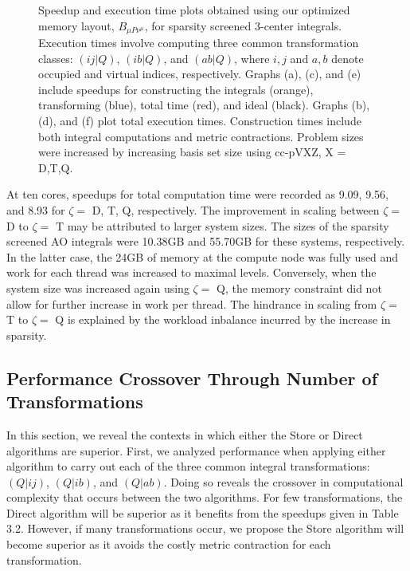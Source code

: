 \begin{figure}[H]
  \hfill
  \hfill
  \caption{Speedup and execution time plots obtained using our optimized memory layout, $B_{\mu P \nu^\mu}$, 
 for sparsity screened 3-center integrals. 
 Execution times involve computing three common transformation classes: $(ij|Q)$, $(ib|Q)$, and $(ab|Q)$,
 where $i,j$ and $a,b$ denote occupied and virtual indices, respectively. Graphs (a), (c), and (e) include speedups for constructing the integrals (orange),
 transforming (blue), total time (red), and ideal (black). Graphs (b), (d), and (f) plot total execution times. Construction times include both integral computations
 and metric contractions. Problem sizes were increased by increasing basis set size
 using cc-pVXZ, X = D,T,Q.}
\end{figure}

At ten cores, speedups for total computation time were recorded as 9.09, 9.56, and 8.93 for $\zeta = $ D, T, Q, 
respectively. The improvement in scaling between $\zeta = $ D to $\zeta = $ T
may be attributed to larger system sizes. The sizes of the sparsity screened AO integrals were 10.38GB and 55.70GB 
for these systems, respectively. In the latter case,
the 24GB of memory at the compute node was fully used and work for each thread was increased to maximal levels. Conversely, 
when the system size was increased again using
$\zeta = $ Q, the memory constraint did not allow for further increase in work per thread. 
The hindrance in scaling from $\zeta = $ T to $\zeta = $ Q is explained by the workload inbalance incurred by
the increase in sparsity. 


\subsection{Performance Crossover Through Number of Transformations}

In this section, we reveal the contexts in which either the Store or Direct algorithms are superior. First, we analyzed performance when applying either algorithm
 to carry out each of the three common integral transformations: $(Q|ij)$, $(Q|ib)$, and $(Q|ab)$. Doing so reveals the crossover in computational complexity that occurs between the two
 algorithms. For few transformations, the Direct algorithm will be superior as it benefits from the speedups given
 in Table 3.2. However, if many transformations occur, we propose the Store algorithm will become superior as it avoids the costly metric contraction for each transformation.
 
